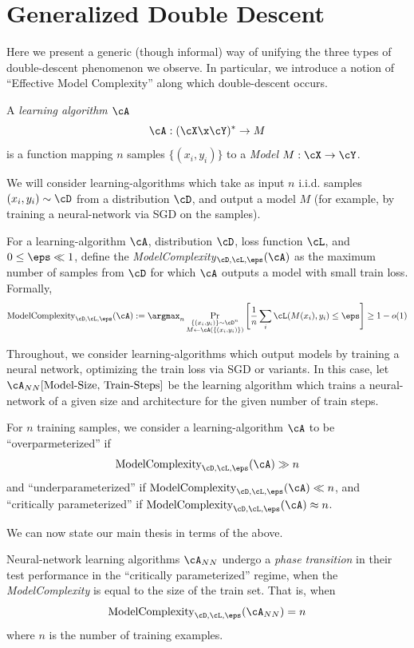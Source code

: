 \section{Generalized Double Descent}
\label{sec:general}

Here we present a generic (though informal) way of unifying the three types of
double-descent phenomenon we observe. In particular, we introduce a notion of ``Effective Model Complexity'' along which double-descent occurs.


\begin{definition}
A \emph{learning algorithm $\cA$}
$$\cA: (\cX \x \cY)^* \to M$$
is a function mapping $n$ samples $\{(x_i, y_i)\}$
to a \emph{Model} $M: \cX \to \cY$.
\end{definition}
We will consider learning-algorithms which take as input
$n$ i.i.d. samples $(x_i, y_i) \sim \cD$ from a distribution $\cD$,
and output a model $M$ (for example, by training a neural-network via SGD on the samples).


\begin{definition}
For a learning-algorithm $\cA$, distribution $\cD$, loss function $\cL$, and $0 \leq \eps \ll 1$,
define the 
\emph{ModelComplexity}$_{\cD, \cL, \eps}(\cA)$
as the maximum number of samples from $\cD$ for which $\cA$ outputs a model with small train loss.
Formally,
$$
\mathrm{ModelComplexity}_{\cD, \cL, \eps}(\cA)
:=
\argmax_n  \Pr_{\substack{
\{(x_i, y_i)\} \sim \cD^n\\
M \gets \cA(\{(x_i, y_i)\})
}}\left[ \frac{1}{n} \sum_i \cL( M(x_i), y_i )  \leq \eps \right] \geq 1-o(1)
$$
\end{definition}

Throughout, we consider learning-algorithms which output models by 
training a neural network, optimizing the train loss via SGD or variants.
In this case, let $\cA_{NN}[\text{Model-Size, Train-Steps}]$ be the learning algorithm
which trains a neural-network of a given size and architecture for the given number of train steps.

For $n$ training samples,
we consider a learning-algorithm $\cA$ to be ``overparmeterized'' if
$$
\mathrm{ModelComplexity}_{\cD, \cL, \eps}(\cA)
\gg n
$$
and ``underparameterized'' if
$\mathrm{ModelComplexity}_{\cD, \cL, \eps}(\cA) \ll n$,
and ``critically parameterized'' if
$\mathrm{ModelComplexity}_{\cD, \cL, \eps}(\cA) \approx n$.


We can now state our main thesis in terms of the above.
\begin{claim}
Neural-network learning algorithms $\cA_{NN}$ undergo
a \emph{phase transition} in their test performance 
in the ``critically parameterized'' regime, when
the \emph{ModelComplexity} is equal to the size of the train set.
That is, when
$$
\mathrm{ModelComplexity}_{\cD, \cL, \eps}(\cA_{NN})
= n
$$
where $n$ is the number of training examples.
\end{claim}


